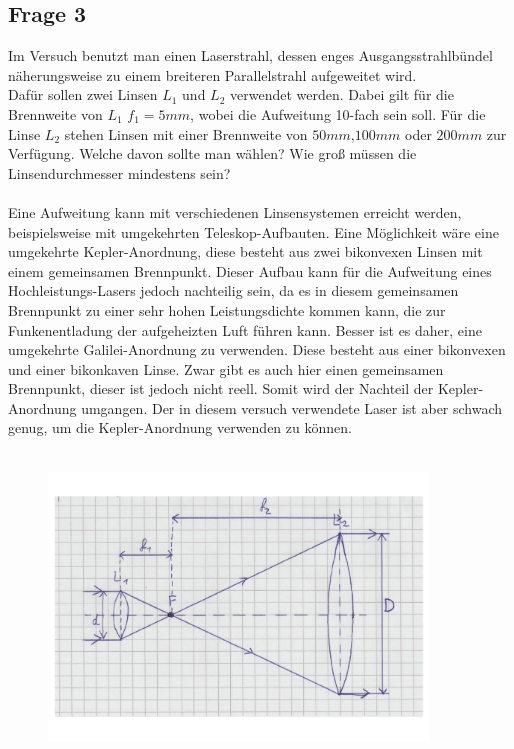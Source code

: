 \documentclass[a4paper,10pt]{scrartcl}
\begin{document}
		\subsection{Frage 3}
			Im Versuch benutzt man einen Laserstrahl, dessen enges Ausgangsstrahlbündel näherungsweise zu einem breiteren Parallelstrahl aufgeweitet wird.\\
			Dafür sollen zwei Linsen \(L_{1}\) und \(L_{2}\) verwendet werden. Dabei gilt für die Brennweite von \(L_{1}\) \(f_{1}=5mm\), wobei die  Aufweitung 10-fach sein soll. Für die Linse \(L_{2}\) stehen Linsen mit einer Brennweite von \(50mm\),\(100mm\) oder \(200mm\) zur Verfügung. Welche davon sollte man wählen? Wie groß müssen die Linsendurchmesser mindestens sein?\\
			\\
			Eine Aufweitung kann mit verschiedenen Linsensystemen erreicht werden, beispielsweise mit umgekehrten Teleskop-Aufbauten. Eine Möglichkeit wäre eine umgekehrte Kepler-Anordnung, diese besteht aus zwei bikonvexen Linsen mit einem gemeinsamen Brennpunkt. Dieser Aufbau kann für die Aufweitung eines Hochleistungs-Lasers jedoch nachteilig sein, da es in diesem gemeinsamen Brennpunkt zu einer sehr hohen Leistungsdichte kommen kann, die zur Funkenentladung der aufgeheizten Luft führen kann. Besser ist es daher, eine umgekehrte Galilei-Anordnung zu verwenden. Diese besteht aus einer bikonvexen und einer bikonkaven Linse. Zwar gibt es auch hier einen gemeinsamen Brennpunkt, dieser ist jedoch nicht reell. 
			Somit wird der Nachteil der Kepler-Anordnung umgangen. Der in diesem versuch verwendete Laser ist aber schwach genug, um die Kepler-Anordnung verwenden zu können.\\
			\\
						\begin{figure}[h]
\centering
\includegraphics[width=0.9\textwidth]{./Bilder/ofa3}

\end{figure}
\end{document}
